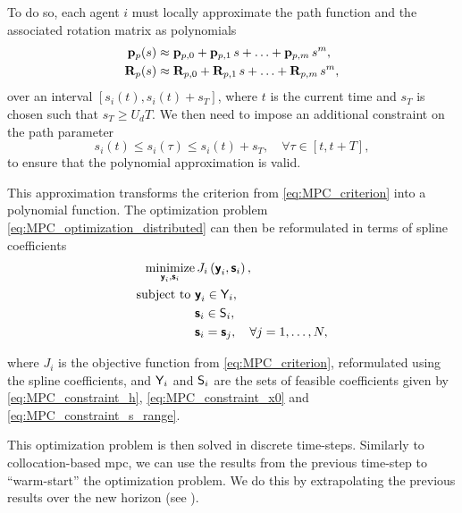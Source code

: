 To do so, each agent $i$ must locally approximate the path function and the associated rotation matrix as polynomials
\begin{align}
    \mathbf{p}_p(s) &\approx \mathbf{p}_{p, 0} + \mathbf{p}_{p, 1}\,s + \ldots + \mathbf{p}_{p, m}\,s^m, \\
    \mathbf{R}_p(s) &\approx \mathbf{R}_{p,0} + \mathbf{R}_{p,1}\,s + \ldots + \mathbf{R}_{p,m}\,s^m,
\end{align}
over an interval $\left[s_i(t), s_i(t) + s_T\right]$, where $t$ is the current time and $s_T$ is chosen such that $s_T \geq U_d T$.
We then need to impose an additional constraint on the path parameter
\begin{equation}
    s_i(t) \leq s_i(\tau) \leq s_i(t) + s_T, \quad \forall \tau \in \left[t, t + T\right], \label{eq:MPC_constraint_s_range}
\end{equation}
to ensure that the polynomial approximation is valid.

This approximation transforms the criterion from \eqref{eq:MPC_criterion} into a polynomial function.
The optimization problem \eqref{eq:MPC_optimization_distributed} can then be reformulated in terms of spline coefficients 
\begin{subequations}
    \begin{align}
            \operatorname*{minimize}_{\boldsymbol{\mathsf{y}}_i, \boldsymbol{\mathsf{s}}_i} &\, J_i\left(\boldsymbol{\mathsf{y}}_i, \boldsymbol{\mathsf{s}}_i\right), \\
        \text{subject to } & \boldsymbol{\mathsf{y}}_i \in \mathsf{Y}_i, \\
        & \boldsymbol{\mathsf{s}}_i \in \mathsf{S}_i, \\
        & \boldsymbol{\mathsf{s}}_i = \boldsymbol{\mathsf{s}}_j, \quad \forall j = 1, \ldots, N, \label{eq:MPC_s_constraint}
    \end{align} \label{eq:MPC_optimization_spline} 
\end{subequations}

\noindent where $J_i$ is the objective function from \eqref{eq:MPC_criterion}, reformulated using the spline coefficients, and $\mathsf{Y}_i$ and $\mathsf{S}_i$ are the sets of feasible coefficients given by \eqref{eq:MPC_constraint_h}, \eqref{eq:MPC_constraint_x0} and \eqref{eq:MPC_constraint_s_range}.

This optimization problem is then solved in discrete time-steps.
Similarly to collocation-based \gls{mpc}, we can use the results from the previous time-step to ``warm-start'' the optimization problem.
We do this by extrapolating the previous results over the new horizon (see ).


